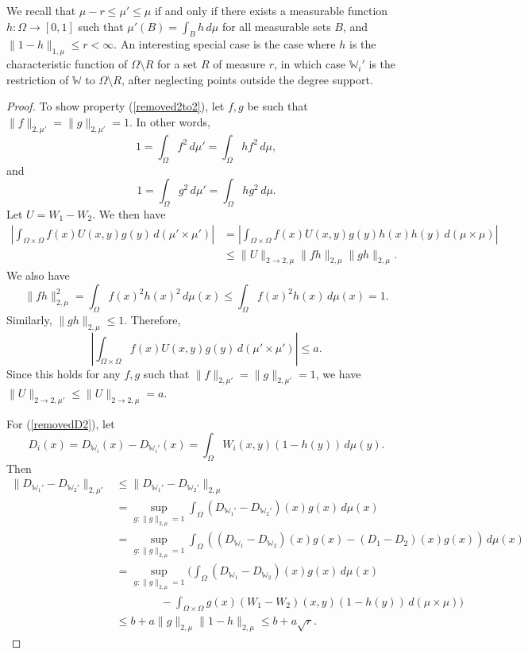 \documentclass{amsart}
\numberwithin{equation}{section}
\numberwithin{figure}{section}
\theoremstyle{definition}
\theoremstyle{remark}
\newcommand{\cW}{\mathbb{W}}
\begin{document}
We recall that $\mu-r \le \mu' \le \mu$ if and only if there exists a
measurable function $h\colon\Omega\to [0,1]$ such that $\mu'(B)=\int_{B}h
\,d\mu$ for all measurable sets $B$, and $\|1-h\|_{1,\mu} \le r<\infty$. An
interesting special case is the case where $h$ is the characteristic function
of $\Omega \setminus R$ for a set $R$ of measure $r$, in which case $\cW_i'$
is the restriction of $\cW$ to $\Omega \setminus R$, after neglecting points
outside the degree support.

\begin{proof}
To show property (\ref{removed2to2}), let $f,g$ be such that
$\|f\|_{2,\mu'}=\|g\|_{2,\mu'}=1$. In other words,
\[1=\int_\Omega f^2 \,d\mu' = \int_{\Omega} h f^2 \,d\mu,
\] and
\[1=\int_\Omega g^2 \,d\mu' = \int_{\Omega} h g^2 \,d\mu
.\] Let $U=W_1-W_2$. We then have
\begin{align*}
\left|\int_{\Omega \times \Omega} f(x) U(x,y) g(y) \,d(\mu' \times \mu') \right| &= \left|\int_{\Omega \times \Omega} f(x) U(x,y) g(y) h(x) h(y) \,d(\mu \times \mu) \right|\\
& \le \|U\|_{2 \rightarrow 2,\mu} \|f h \|_{2,\mu} \|g h \|_{2,\mu}
.
\end{align*}
We also have
\[\|fh\|_{2,\mu}^2=\int_\Omega f(x)^2h(x)^2 \,d\mu(x) \le \int_\Omega f(x)^2h(x) \,d\mu(x) = 1
.\] Similarly, $\|gh\|_{2,\mu} \le 1$. Therefore,
\[\left|\int_{\Omega \times \Omega} f(x) U(x,y) g(y) \,d(\mu' \times \mu') \right| \le a
.\] Since this holds for any $f,g$ such that
$\|f\|_{2,\mu'}=\|g\|_{2,\mu'}=1$, we have $\|U\|_{2 \rightarrow 2,\mu'} \le
\|U\|_{2 \rightarrow 2,\mu}=a$.

For (\ref{removedD2}), let
\[D_i(x)=D_{\cW_i}(x)-D_{\cW_i'}(x)=\int_{\Omega}W_i(x,y) (1-h(y))\,d\mu(y)
.\] Then
\begin{align*}
\|D_{\cW_1'}-D_{\cW_2'}\|_{2,\mu'} &\le \|D_{\cW_1'}-D_{\cW_2'}\|_{2,\mu}\\
& =\sup_{g:\|g\|_{2,\mu}=1} \int_{\Omega} (D_{\cW_1'}-D_{\cW_2'})(x)g(x)\,d\mu(x) \\
&= \sup_{g:\|g\|_{2,\mu}=1} \int_{\Omega}\left( (D_{\cW_1}-D_{\cW_2})(x)g(x)-(D_1-D_2)(x)g(x)\right)\,d\mu(x)\\
&=
\sup_{g:\|g\|_{2,\mu}=1} \Bigg(
\int_{\Omega} (D_{\cW_1}-D_{\cW_2})(x)g(x) \,d\mu(x)\\
& \qquad \qquad \phantom{} - \int_{\Omega \times \Omega} g(x)(W_1-W_2)(x,y)(1-h(y)) \,d(\mu \times \mu)
\Bigg)\\
&\le b+ a \|g\|_{2,\mu}\|1-h\|_{2,\mu}
\le b + a \sqrt{r}
.\end{align*}


\end{proof}
\end{document}
